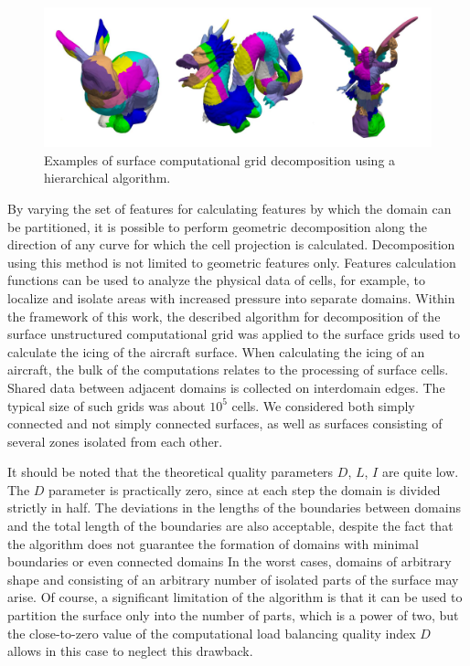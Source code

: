 \documentclass[
11pt,%
tightenlines,%
twoside,%
onecolumn,%
nofloats,%
nobibnotes,%
nofootinbib,%
superscriptaddress,%
noshowpacs,%
centertags]%
{revtex4}
\begin{document}
\begin{figure}[h]
\includegraphics[width=1.0\textwidth]{pics/03-hierarch.pdf}
\caption{Examples of surface computational grid decomposition using a hierarchical algorithm.}\label{fig:03-hierarch}
\end{figure}

By varying the set of features for calculating features by which the domain can be partitioned, it is possible to perform geometric decomposition along the direction of any curve for which the cell projection is calculated.
Decomposition using this method is not limited to geometric features only.
Features calculation functions can be used to analyze the physical data of cells, for example, to localize and isolate areas with increased pressure into separate domains.
Within the framework of this work, the described algorithm for decomposition of the surface unstructured computational grid was applied to the surface grids used to calculate the icing of the aircraft surface.
When calculating the icing of an aircraft, the bulk of the computations relates to the processing of surface cells.
Shared data between adjacent domains is collected on interdomain edges.
The typical size of such grids was about $ 10^5 $ cells. We considered both simply connected and not simply connected surfaces, as well as surfaces consisting of several zones isolated from each other.

It should be noted that the theoretical quality parameters $ D $, $ L $, $ I $ are quite low.
The $ D $ parameter is practically zero, since at each step the domain is divided strictly in half.
The deviations in the lengths of the boundaries between domains and the total length of the boundaries are also acceptable, despite the fact that the algorithm does not guarantee the formation of domains with minimal boundaries or even connected domains
In the worst cases, domains of arbitrary shape and consisting of an arbitrary number of isolated parts of the surface may arise.
Of course, a significant limitation of the algorithm is that it can be used to partition the surface only into the number of parts, which is a power of two, but the close-to-zero value of the computational load balancing quality index $ D $ allows in this case to neglect this drawback.
\end{document}
